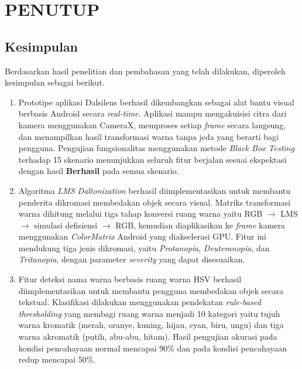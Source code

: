 

\chapter{PENUTUP}


\section{Kesimpulan}

Berdasarkan hasil penelitian dan pembahasan yang telah dilakukan, diperoleh kesimpulan
sebagai berikut.
\begin{enumerate}
  \item Prototipe aplikasi Dalsilens berhasil dikembangkan sebagai alat bantu visual
        berbasis Android secara \textit{real-time}.
        Aplikasi mampu mengakuisisi citra dari kamera menggunakan CameraX,
        memproses setiap \textit{frame} secara langsung, dan menampilkan hasil
        transformasi warna tanpa jeda yang berarti bagi pengguna.
        Pengujian fungsionalitas menggunakan metode \textit{Black Box Testing}
        terhadap 15 skenario menunjukkan seluruh fitur berjalan sesuai ekspektasi
        dengan hasil \textbf{Berhasil} pada semua skenario.

  \item Algoritma \textit{LMS Daltonization} berhasil diimplementasikan untuk
        membantu penderita dikromasi membedakan objek secara visual.
        Matriks transformasi warna dihitung melalui tiga tahap konversi ruang warna yaitu
        RGB $\rightarrow$ LMS $\rightarrow$ simulasi defisiensi $\rightarrow$ RGB,
        kemudian diaplikasikan ke \textit{frame} kamera menggunakan
        \textit{ColorMatrix} Android yang diakselerasi GPU.
        Fitur ini mendukung tiga jenis dikromasi, yaitu \textit{Protanopia},
        \textit{Deuteranopia}, dan \textit{Tritanopia}, dengan parameter
        \textit{severity} yang dapat disesuaikan.

  \item Fitur deteksi nama warna berbasis ruang warna HSV berhasil
        diimplementasikan untuk membantu pengguna membedakan objek secara tekstual.
        Klasifikasi dilakukan menggunakan pendekatan \textit{rule-based thresholding}
        yang membagi ruang warna menjadi 10 kategori yaitu tujuh warna kromatik
        (merah, oranye, kuning, hijau, cyan, biru, ungu) dan tiga warna akromatik
        (putih, abu-abu, hitam).
        Hasil pengujian akurasi pada kondisi pencahayaan normal mencapai
        90\% dan pada kondisi pencahayaan redup mencapai 50\%.


\end{enumerate}
